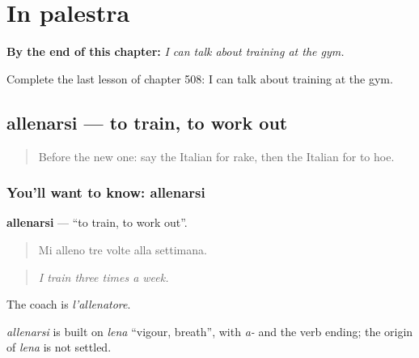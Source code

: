 
\chapter{In palestra}
\label{ch:it-in-palestra}

\begin{chapteropening}
\textbf{By the end of this chapter:} \emph{I can talk about training at the gym.}

Complete the last lesson of chapter 508: I can talk about training at the gym.
\end{chapteropening}

\section[allenarsi]{allenarsi — to train, to work out}

\label{lesson:IT-C508-allenarsi}



\begin{quote}
Before the new one: say the Italian for rake, then the Italian for to hoe.
\end{quote}

\subsection*{You'll want to know: allenarsi}
\textbf{allenarsi} — \textquotedblleft{}to train, to work out\textquotedblright{}.

\begin{quote}
Mi alleno tre volte alla settimana.
\end{quote}

\begin{quote}
\emph{I train three times a week.}
\end{quote}

The coach is \emph{l'allenatore}.

\begin{cousinweb}
\emph{allenarsi} is built on \emph{lena} \textquotedblleft{}vigour, breath\textquotedblright{}, with \emph{a-} and the verb ending; the origin of \emph{lena} is not settled.
\end{cousinweb}

